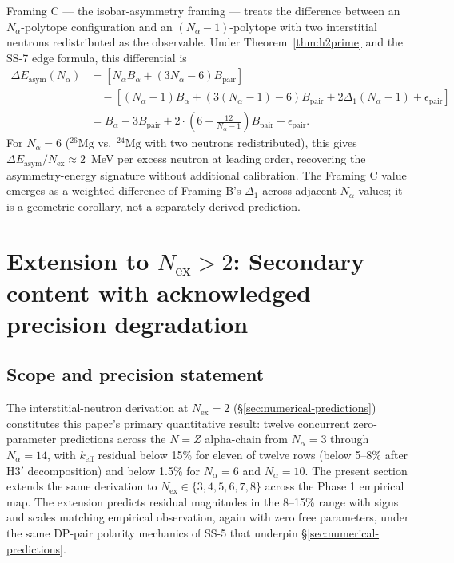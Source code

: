 \documentclass[11pt,letterpaper]{article}
\theoremstyle{definition}
\newcommand{\Bpair}{B_{\text{pair}}}
\newcommand{\Nalpha}{N_\alpha}
\newcommand{\Nex}{N_{\text{ex}}}
\begin{document}
Framing C --- the isobar-asymmetry framing --- treats the difference between an $\Nalpha$-polytope configuration and an $(\Nalpha - 1)$-polytope with two interstitial neutrons redistributed as the observable. Under Theorem~\ref{thm:h2prime} and the SS-7 edge formula, this differential is
\begin{align}
  \Delta E_{\text{asym}}(\Nalpha) &= [N_{\alpha} B_\alpha + (3\Nalpha - 6) \Bpair] \nonumber \\
  & \quad - [(\Nalpha - 1) B_\alpha + (3(\Nalpha - 1) - 6)\Bpair + 2 \Delta_1(\Nalpha - 1) + \epsilon_{\text{pair}}] \nonumber \\
  &= B_\alpha - 3\Bpair + 2 \cdot \left(6 - \frac{12}{\Nalpha - 1}\right)\Bpair + \epsilon_{\text{pair}}.
\end{align}
For $\Nalpha = 6$ (${}^{26}\mathrm{Mg}$ vs.\ ${}^{24}\mathrm{Mg}$ with two neutrons redistributed), this gives $\Delta E_{\text{asym}}/\Nex \approx 2$~MeV per excess neutron at leading order, recovering the asymmetry-energy signature without additional calibration. The Framing C value emerges as a weighted difference of Framing B's $\Delta_1$ across adjacent $\Nalpha$ values; it is a geometric corollary, not a separately derived prediction.


\section{Extension to $\Nex > 2$: Secondary content with acknowledged precision degradation}
\label{sec:extension-nex}

\subsection{Scope and precision statement}
\label{sec:ext-scope}

The interstitial-neutron derivation at $\Nex = 2$ (\S\ref{sec:numerical-predictions}) constitutes this paper's primary quantitative result: twelve concurrent zero-parameter predictions across the $N = Z$ alpha-chain from $\Nalpha = 3$ through $\Nalpha = 14$, with $k_{\text{eff}}$ residual below 15\% for eleven of twelve rows (below 5--8\% after H3$'$ decomposition) and below 1.5\% for $\Nalpha = 6$ and $\Nalpha = 10$. The present section extends the same derivation to $\Nex \in \{3, 4, 5, 6, 7, 8\}$ across the Phase 1 empirical map. The extension predicts residual magnitudes in the 8--15\% range with signs and scales matching empirical observation, again with zero free parameters, under the same DP-pair polarity mechanics of SS-5 that underpin \S\ref{sec:numerical-predictions}.
\end{document}
